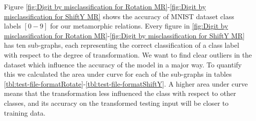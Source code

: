     Figure \ref{fig:Digit by misclassification for Rotation MR}-\ref{fig:Digit by misclassification for ShiftY MR} shows the accuracy of MNIST dataset class labels $[0-9]$ for our metamorphic relations. Every figure in \ref{fig:Digit by misclassification for Rotation MR}-\ref{fig:Digit by misclassification for ShiftY MR} has ten sub-graphs, each representing the correct classification of a class label with respect to the degree of transformation. We want to find clear outliers in the dataset which influence the accuracy of the model in a major way. To quantify this we calculated the area under curve for each of the sub-graphs in tables \ref{tbl:test-file-formatRotate}-\ref{tbl:test-file-formatShiftY}. A higher area under curve means that the transformation less influenced the class with respect to other classes, and its accuracy on the transformed testing input will be closer to training data.
    

